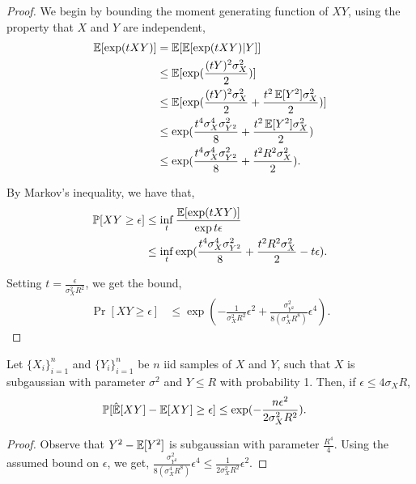 \documentclass[tablecaption=bottom]{jmlr}
\begin{document}
\begin{proof}
  We begin by bounding the moment generating function of $XY$, using the property that $X$ and $Y$ are independent,
  \begin{align}
    \operatorname{\mathbb{E}}[ \exp(t X Y) ] 
      &= \operatorname{\mathbb{E}}[ \operatorname{\mathbb{E}}[ \exp(t X Y) | Y ] ] \\
      &\le \operatorname{\mathbb{E}}[ \exp(\frac{(tY)^2 \sigma^2_X}{2}) ] \\
      &\le \operatorname{\mathbb{E}}[ \exp(\frac{(tY)^2 \sigma^2_X}{2} + \frac{t^2 \operatorname{\mathbb{E}}[Y^2] \sigma^2_X}{2}) ] \\
      &\le \exp(\frac{t^4 \sigma^4_X \sigma^2_{Y^2} }{8}  + \frac{t^2 \operatorname{\mathbb{E}}[Y^2] \sigma^2_X}{2}) \\
      &\le \exp(\frac{t^4 \sigma^4_X \sigma^2_{Y^2} }{8}  + \frac{t^2 R^2 \sigma^2_X}{2}).
  \end{align}

  By Markov's inequality, we have that,
  \begin{align}
    \mathbb{P}[ XY \ge \epsilon ] 
      &\le \inf_t \frac{\operatorname{\mathbb{E}}[\exp(t XY)]}{\exp{t\epsilon}} \\
      &\le \inf_t \exp(\frac{t^4 \sigma^4_X \sigma^2_{Y^2} }{8} + \frac{t^2 R^2 \sigma^2_X}{2} - t\epsilon).
  \end{align}

  Setting $t = \frac{\epsilon}{\sigma^2_X R^2 }$, we get the bound,
  \begin{align}
    \Pr[ XY \ge \epsilon ] 
      &\le 
        \exp( - \frac{1}{\sigma^2_X R^2} \epsilon^{2} 
          + \frac{\sigma^2_{Y^2}}{8 (\sigma^4_X R^8)} \epsilon^{4} ).
  \end{align}

\end{proof}

\begin{corollary}
  Let $\{X_i\}_{i=1}^n$ and $\{Y_i\}_{i=1}^n$ be $n$ iid
  samples of $X$ and $Y$, such that $X$ is subgaussian with parameter
  $\sigma^2$ and $Y \le R$ with probability 1. Then, if $\epsilon \le 4 \sigma_X R$,
  \begin{align}
    \mathbb{P}[ \hat{\operatorname{\mathbb{E}}}[ X Y ] - \operatorname{\mathbb{E}}[ X Y ] \ge \epsilon ] 
    &\le \exp( - \frac{n \epsilon^2}{2 \sigma^2_X R^2 } ).
  \end{align}
\end{corollary}
\begin{proof}
  Observe that $Y^2 - \operatorname{\mathbb{E}}[Y^2]$ is subgaussian with parameter $\frac{R^4}{4}$. Using the assumed bound on $\epsilon$, we get,
  $\frac{\sigma^2_{Y^2}}{8 (\sigma^4_X R^8)} \epsilon^{4} \le \frac{1}{2\sigma^2_X R^2} \epsilon^{2}$.
\end{proof}
\end{document}
